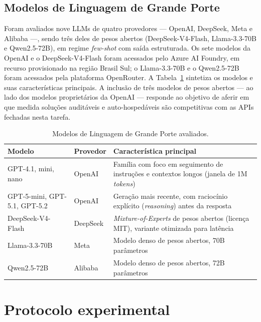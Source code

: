 \subsection{Modelos de Linguagem de Grande Porte}
\label{sec:llm_models}

Foram avaliados nove LLMs de quatro provedores --- OpenAI, DeepSeek, Meta e Alibaba ---, sendo três deles de pesos abertos (DeepSeek-V4-Flash, Llama-3.3-70B e Qwen2.5-72B), em regime \textit{few-shot} com saída estruturada. Os sete modelos da OpenAI e o DeepSeek-V4-Flash foram acessados pelo Azure AI Foundry, em recurso provisionado na região Brasil Sul; o Llama-3.3-70B e o Qwen2.5-72B foram acessados pela plataforma OpenRouter. A Tabela~\ref{tab:llms_avaliados} sintetiza os modelos e suas características principais. A inclusão de três modelos de pesos abertos --- ao lado dos modelos proprietários da OpenAI --- responde ao objetivo de aferir em que medida soluções auditáveis e auto-hospedáveis são competitivas com as APIs fechadas nesta tarefa.

\begin{table}[ht]
\centering
\caption{Modelos de Linguagem de Grande Porte avaliados.}
\label{tab:llms_avaliados}
\small
\begin{tabular}{p{3.4cm}p{2.2cm}p{7.1cm}}
\toprule
\textbf{Modelo} & \textbf{Provedor} & \textbf{Característica principal} \\
\midrule
GPT-4.1, mini, nano \cite{openai2025gpt41} & OpenAI & Família com foco em seguimento de instruções e contextos longos (janela de 1M \textit{tokens}) \\
GPT-5-mini, GPT-5.1, GPT-5.2 \cite{openai2025gpt5} & OpenAI & Geração mais recente, com raciocínio explícito (\textit{reasoning}) antes da resposta \\
DeepSeek-V4-Flash \cite{deepseekai2025deepseekv4} & DeepSeek & \textit{Mixture-of-Experts} de pesos abertos (licença MIT), variante otimizada para latência \\
Llama-3.3-70B \cite{meta2024llama33} & Meta & Modelo denso de pesos abertos, 70B parâmetros \\
Qwen2.5-72B \cite{qwen2024qwen25} & Alibaba & Modelo denso de pesos abertos, 72B parâmetros \\
\bottomrule
\end{tabular}
\end{table}

\section{Protocolo experimental}
\label{sec:protocolo}

